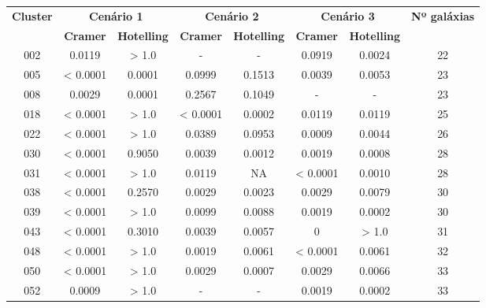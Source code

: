 {\scriptsize
\begin{longtable}{cccccccc}
\hline
\multirow{2}{*}{\textbf{Cluster}} & \multicolumn{2}{|c|}{\textbf{Cenário 1}} & \multicolumn{2}{c|}{\textbf{Cenário 2}} & \multicolumn{2}{c|}{\textbf{Cenário 3}} & \multirow{2}{*}{\textbf{Nº galáxias}} \\ \cline{2-7}
                         & \multicolumn{1}{|c}{\textbf{Cramer}}       & \textbf{Hotelling}       & \textbf{Cramer}       & \textbf{Hotelling}       & \textbf{Cramer}       & \textbf{Hotelling}       &                              \\ \hline
002 & {\color{red}0.0119} & > 1.0 & - & - & 0.0919 & {\color{red}0.0024} & 22 \\
005 & {\color{red} < 0.0001} & {\color{red}0.0001} & 0.0999 & 0.1513 & {\color{red}0.0039} & {\color{red}0.0053} & 23 \\
008 & {\color{red}0.0029} & {\color{red}0.0001} & 0.2567 & 0.1049 & - & - & 23 \\
018 & {\color{red} < 0.0001} & > 1.0 & {\color{red} < 0.0001} & {\color{red}0.0002} & {\color{red}0.0119} & {\color{red}0.0119} & 25 \\
022 & {\color{red} < 0.0001} & > 1.0 & {\color{red}0.0389} & 0.0953 & {\color{red}0.0009} & {\color{red}0.0044} & 26 \\
030 & {\color{red} < 0.0001} & 0.9050 & {\color{red}0.0039} & {\color{red}0.0012} & {\color{red}0.0019} & {\color{red}0.0008} & 28 \\
031 & {\color{red} < 0.0001} & > 1.0 & {\color{red}0.0119} & NA & {\color{red} < 0.0001} & {\color{red}0.0010} & 28 \\
038 & {\color{red} < 0.0001} & 0.2570 & {\color{red}0.0029} & {\color{red}0.0023} & {\color{red}0.0029} & {\color{red}0.0079} & 30 \\
039 & {\color{red} < 0.0001} & > 1.0 & {\color{red}0.0099} & {\color{red}0.0088} & {\color{red}0.0019} & {\color{red}0.0002} & 30 \\
043 & {\color{red} < 0.0001} & 0.3010 & {\color{red}0.0039} & {\color{red}0.0057} & {\color{red}0} & > 1.0 & 31 \\
048 & {\color{red} < 0.0001} & > 1.0 & {\color{red}0.0019} & {\color{red}0.0061} & {\color{red} < 0.0001} & {\color{red}0.0061} & 32 \\
050 & {\color{red} < 0.0001} & > 1.0 & {\color{red}0.0029} & {\color{red}0.0007} & {\color{red}0.0029} & {\color{red}0.0066} & 33 \\
052 & {\color{red}0.0009} & > 1.0 & - & - & {\color{red}0.0019} & {\color{red}0.0002} & 33 \\

\end{longtable}}

